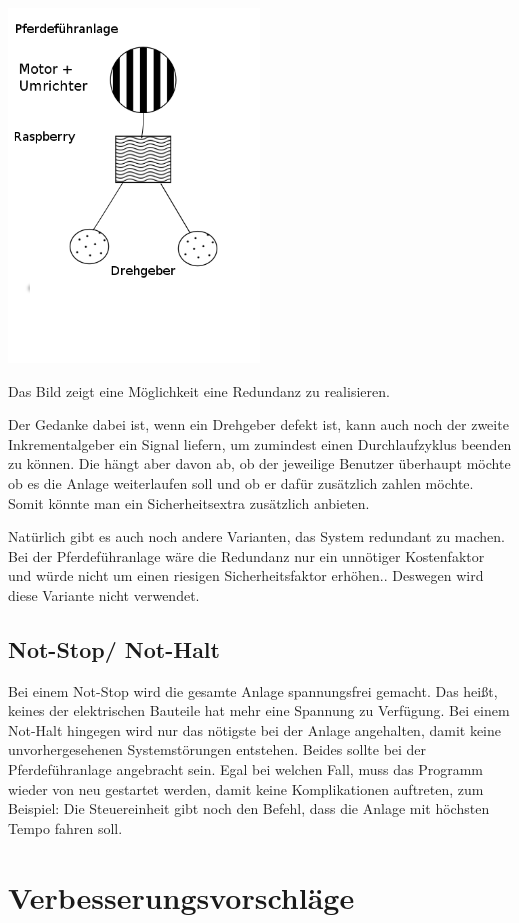 \begin{center}
	\includegraphics[width=0.5\textwidth]{fig/Redundanz}
\end{center}

Das Bild zeigt eine Möglichkeit eine Redundanz zu realisieren.

Der Gedanke dabei ist, wenn ein Drehgeber defekt ist, kann auch noch der zweite Inkrementalgeber ein Signal liefern, um zumindest einen Durchlaufzyklus beenden zu können. Die hängt aber davon ab, ob der jeweilige Benutzer überhaupt möchte ob es die Anlage weiterlaufen soll und ob er dafür zusätzlich zahlen möchte. Somit könnte man ein Sicherheitsextra zusätzlich anbieten.

Natürlich gibt es auch noch andere Varianten, das System redundant zu machen.
Bei der Pferdeführanlage wäre die Redundanz nur ein unnötiger Kostenfaktor und würde nicht um einen riesigen Sicherheitsfaktor erhöhen..
Deswegen wird diese Variante nicht verwendet.

\subsection{Not-Stop/ Not-Halt}
\label{sec:notstop}

Bei einem Not-Stop wird die gesamte Anlage spannungsfrei gemacht. Das heißt, keines der elektrischen Bauteile hat mehr eine Spannung zu Verfügung. Bei einem Not-Halt hingegen wird nur das nötigste bei der Anlage angehalten, damit keine unvorhergesehenen Systemstörungen entstehen. Beides sollte bei der Pferdeführanlage angebracht sein. Egal bei welchen Fall, muss das Programm wieder von neu gestartet werden, damit keine Komplikationen auftreten, zum Beispiel: Die Steuereinheit gibt noch den Befehl, dass die Anlage mit höchsten Tempo fahren soll. 
\newpage

\section{Verbesserungsvorschläge}
\label{sec:verbesserungsvorschläge}


